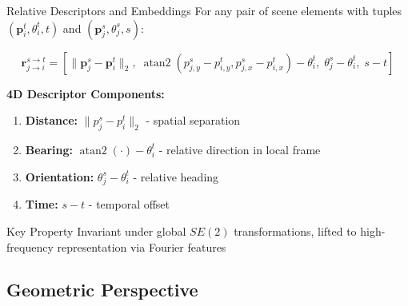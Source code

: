 \documentclass[10pt,aspectratio=169]{beamer}
\DeclareMathOperator{\atan}{atan2}
\begin{document}
\begin{frame}{Relative Descriptors and Embeddings}
For any pair of scene elements with tuples $(\mathbf{p}_i^t, \theta_i^t, t)$ and $(\mathbf{p}_j^s, \theta_j^s, s)$:

\begin{equation}
\mathbf{r}_{j\to i}^{s\to t} = \left[
    \|\mathbf{p}_j^s-\mathbf{p}_i^t\|_2,\;
    \atan(p_{j,y}^s-p_{i,y}^t, p_{j,x}^s-p_{i,x}^t)-\theta_i^t,\;
    \theta_j^s-\theta_i^t,\;
    s-t
\right]
\end{equation}

\vspace{0.5cm}

\textbf{4D Descriptor Components:}    \begin{enumerate}
    \item \textbf{Distance:} $\|p_j^s-p_i^t\|_2$ - spatial separation
    \item \textbf{Bearing:} $\atan(\cdot)-\theta_i^t$ - relative direction in local frame
    \item \textbf{Orientation:} $\theta_j^s-\theta_i^t$ - relative heading
    \item \textbf{Time:} $s-t$ - temporal offset
\end{enumerate}

\begin{block}{Key Property}
Invariant under global $SE(2)$ transformations, lifted to high-frequency representation via Fourier features
\end{block}
\end{frame}

\subsection{Geometric Perspective}
\end{document}
